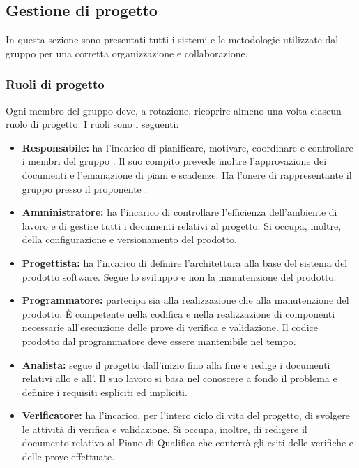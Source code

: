 \subsection{Gestione di progetto}
In questa sezione sono presentati tutti i sistemi e le metodologie utilizzate dal gruppo per una corretta organizzazione e collaborazione.
\subsubsection{Ruoli di progetto}
Ogni membro del gruppo deve, a rotazione, ricoprire almeno una volta ciascun ruolo di progetto.
I ruoli sono i seguenti:
\begin{itemize}
\item \textbf{Responsabile:} ha l'incarico di pianificare, motivare, coordinare e controllare i membri del gruppo \Gruppo{}.
Il suo compito prevede inoltre l'approvazione dei documenti e l'emanazione di piani e scadenze.
Ha l'onere di rappresentante il gruppo presso il proponente \Proponente{}.
\item \textbf{Amministratore:} ha l'incarico di controllare l'efficienza dell'ambiente di lavoro e di gestire tutti i documenti relativi al progetto.
Si occupa, inoltre, della configurazione e versionamento del prodotto.
\item \textbf{Progettista:} ha l'incarico di definire l'architettura alla base del sistema del prodotto software.
Segue lo sviluppo e non la manutenzione del prodotto.
\item \textbf{Programmatore:} partecipa sia alla realizzazione che alla manutenzione del prodotto.
È competente nella codifica e nella realizzazione di componenti necessarie all’esecuzione delle prove di verifica e validazione.
Il codice prodotto dal programmatore deve essere mantenibile nel tempo.
\item \textbf{Analista:} segue il progetto dall'inizio fino alla fine e redige i documenti relativi allo \SdF{} e all'\AdR{}.
Il suo lavoro si basa nel conoscere a fondo il problema e definire i requisiti espliciti ed impliciti.
\item \textbf{Verificatore:} ha l'incarico, per l'intero ciclo di vita del progetto, di svolgere le attività di verifica e validazione.
Si occupa, inoltre, di redigere il documento relativo al Piano di Qualifica che conterrà gli esiti delle verifiche e delle prove effettuate.
\end{itemize}

